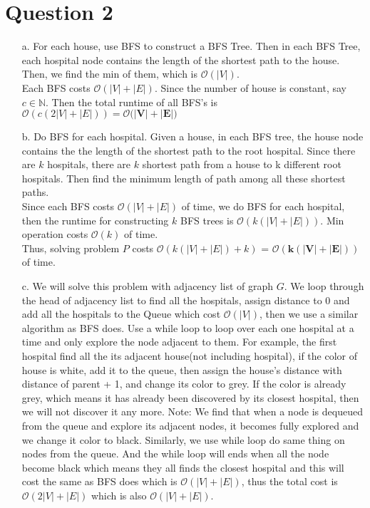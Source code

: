 \documentclass[10pt]{article}
\begin{document}
\section*{Question 2}
\begin{itemize}
\item[a.]
For each house, use BFS to construct a BFS Tree. Then in each BFS Tree, each hospital node contains the length of the shortest path to the house. Then, we find the min of them, which is $\mathcal{O}(|V|)$.\\
Each BFS costs $\mathcal{O}(|V|+|E|)$. Since the number of house is constant, say $c\in\mathbb{N}$. Then the total runtime of all BFS's is $\mathcal{O}(c(2|V|+|E|))=\boldsymbol{\mathcal{O}(|V|+|E|})$
\item[b.]
Do BFS for each hospital. Given a house, in each BFS tree, the house node contains the the length of the shortest path to the root hospital. Since there are $k$ hospitals, there are $k$ shortest path from a house to k different root hospitals. Then find the minimum length of path among all these shortest paths.\\
Since each BFS costs $\mathcal{O}(|V|+|E|)$ of time, we do BFS for each hospital, then the runtime for constructing $k$ BFS trees is $\mathcal{O}(k(|V|+|E|))$. Min operation costs $\mathcal{O}(k)$ of time.\\
Thus, solving problem $P$ costs $\mathcal{O}(k(|V|+|E|)+k)$ = $\boldsymbol{\mathcal{O}(k(|V|+|E|))}$ of time.
\item[c.]
We will solve this problem with adjacency list of graph $G$. We loop through the head of adjacency list to find all the hospitals, assign distance to 0 and add all the hospitals to the Queue which cost $\mathcal{O}(|V|)$, then we use a similar algorithm as BFS does. Use a while loop to loop over each one hospital at a time and only explore the node adjacent to them. For example, the first hospital find all the its adjacent house(not including hospital), if the color of house is white, add it to the queue, then assign the house's distance with distance of parent + 1,  and change its color to grey. If the color is already grey, which means it has already been discovered by its closest hospital, then we will not discover it any more. Note: We find that when a node is dequeued from the queue and explore its adjacent nodes, it becomes fully explored and we change it color to black. Similarly, we use while loop do same thing on nodes from the queue. And the while loop will ends when all the node become black which means they all finds the closest hospital and this will cost the same as BFS does which is $\mathcal{O}(|V|+|E|)$, thus the total cost is $\mathcal{O}(2|V| + |E|)$ which is also $\mathcal{O}(|V| + |E|)$.

\end{itemize}
\end{document}
